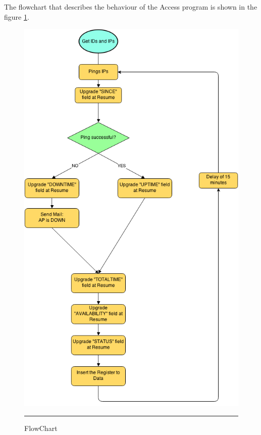 \documentclass[12pt, a4paper,twoside]{tesi_upf}
\begin{document}
            The flowchart that describes the behaviour of the Access program is shown in the figure \ref{fig:accessp}. 
            \begin{figure}[htbp]
              \centering
                  \includegraphics[scale=0.5]{./figures/Flowchart.png}
                  \rule{32em}{0.5pt}
              \caption[Access Program FlowChart]{FlowChart}
              \label{fig:accessp}
            \end{figure}
        
\end{document}
